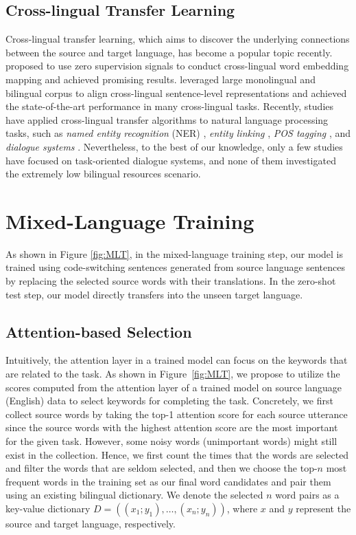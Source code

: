 \documentclass[letterpaper]{article}
\newcommand{\citet}[1]{\citeauthor{#1} \shortcite{#1}}
\begin{document}
\subsection{Cross-lingual Transfer Learning}
Cross-lingual transfer learning, which aims to discover the underlying connections between the source and target language, has become a popular topic recently. \citet{conneau2017word} proposed to use zero supervision signals to conduct cross-lingual word embedding mapping and achieved promising results.
\citet{devlin2019bert,lample2019cross} leveraged large monolingual and bilingual corpus to align cross-lingual sentence-level representations and achieved the state-of-the-art performance in many cross-lingual tasks.
Recently, studies have applied cross-lingual transfer algorithms to natural language processing tasks, such as \textit{named entity recognition} (NER) \cite{ni2017weakly}, \textit{entity linking} \cite{pan2017cross}, \textit{POS tagging} \cite{kim2017cross,zhang2016ten}, and \textit{dialogue systems} \cite{chen2018xl,upadhyay2018almost,liu2019zero}.
Nevertheless, to the best of our knowledge, only a few studies have focused on task-oriented dialogue systems, and none of them investigated the extremely low bilingual resources scenario.

\section{Mixed-Language Training}
As shown in Figure \ref{fig:MLT}, in the mixed-language training step, our model is trained using code-switching sentences generated from source language sentences by replacing the selected source words with their translations. In the zero-shot test step, our model directly transfers into the unseen target language.

\subsection{Attention-based Selection}
Intuitively, the attention layer in a trained model can focus on the keywords that are related to the task. As shown in Figure~\ref{fig:MLT}, we propose to utilize the scores computed from the attention layer of a trained model on source language (English) data to select keywords for completing the task.
Concretely, we first collect source words by taking the top-1 attention score for each source utterance since the source words with the highest attention score are the most important for the given task. However, some noisy words (unimportant words) might still exist in the collection. Hence, we first count the times that the words are selected and filter the words that are seldom selected, and then we choose the top-$n$ most frequent words in the training set as our final word candidates and pair them using an existing bilingual dictionary. We denote the selected $n$ word pairs as a key-value dictionary $D =  ((x_1;y_1),\dots,(x_n;y_n))$, where $x$ and $y$ represent the source and target language, respectively.
\end{document}
